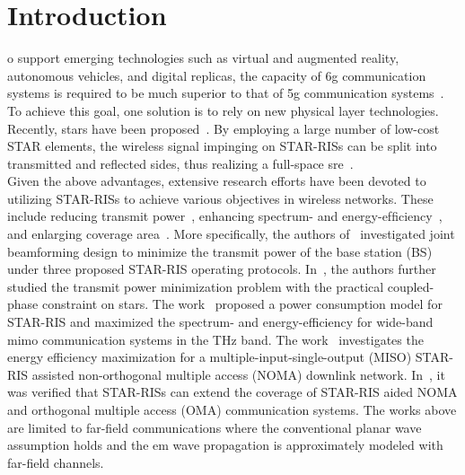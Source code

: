 \documentclass[12pt, draftclsnofoot, onecolumn]{IEEEtran}
\newcommand{\sixg}{\gls{6g}\xspace}
\newcommand{\fiveg}{\gls{5g}\xspace}
\newcommand{\sre}{\gls{sre}\xspace}
\newcommand{\starriss}{\gls{stars}\xspace}
\newcommand{\mimo}{\gls{mimo}\xspace}
\newcommand{\emm}{\gls{em}\xspace}
\begin{document}
\section{Introduction}
o support emerging technologies such as virtual and augmented reality, autonomous vehicles, and digital replicas, the capacity of \sixg communication systems is required to be much superior to that of \fiveg communication systems~\cite{9349624}. To achieve this goal, one solution is to rely on new physical layer technologies. Recently, \starriss have been proposed~\cite{9690478,xu2022star,zuo2022joint}. By employing a large number of low-cost STAR elements, the wireless signal impinging on STAR-RISs can be split into transmitted and reflected sides, thus realizing a full-space \sre~\cite{9140329,9424177,liu2023simultaneously}.\\
\indent Given the above advantages, extensive research efforts have been devoted to utilizing STAR-RISs to achieve various objectives in wireless networks. These include reducing transmit power~\cite{9570143,liu2022simultaneously}, enhancing spectrum- and energy-efﬁciency~\cite{wang2022simultaneously,10052764}, and enlarging coverage area~\cite{wu2021coverage}. More speciﬁcally, the authors of~\cite{9570143} investigated joint beamforming design to minimize the transmit power of the base station (BS) under three proposed  STAR-RIS operating protocols. In~\cite{liu2022simultaneously}, the authors further studied the transmit power minimization problem with the practical coupled-phase constraint on \starriss. The work~\cite{wang2022simultaneously} proposed a power consumption model for STAR-RIS and maximized the spectrum- and energy-efficiency for wide-band \mimo communication systems in the THz band. The work~\cite{10052764} investigates the energy efficiency maximization for a multiple-input-single-output (MISO) STAR-RIS assisted non-orthogonal multiple access (NOMA) downlink network. In~\cite{wu2021coverage}, it was verified that STAR-RISs can extend the coverage of STAR-RIS aided NOMA and orthogonal multiple access (OMA) communication systems. The works above are limited to far-field communications where the conventional planar wave assumption holds and the \emm wave propagation is approximately modeled with far-field channels.\\ 
\end{document}
